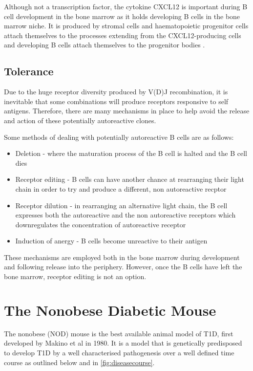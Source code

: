 Although not a transcription factor, the cytokine CXCL12 is important during B cell development in the bone marrow as it holds developing B cells in the bone marrow niche.
It is produced by stromal cells and haematopoietic progenitor cells attach themselves to the processes extending from the CXCL12-producing cells and developing B cells attach themselves to the progenitor bodies \citep{Tokoyoda2004}.

\subsection{Tolerance}

Due to the huge receptor diversity produced by V(D)J recombination, it is inevitable that some combinations will produce receptors responsive to self antigens.
Therefore, there are many mechanisms in place to help avoid the release and action of these potentially autoreactive clones.

Some methods of dealing with potentially autoreactive B cells are as follows:
\begin{itemize}
\item Deletion - where the maturation process of the B cell is halted and the B cell dies \citep{Cornall1995}
\item Receptor editing - B cells can have another chance at rearranging their light chain in order to try and produce a different, non autoreactive recptor \citep{Orduno2009, Gay1993}
\item Receptor dilution - in rearranging an alternative light chain, the B cell expresses both the autoreactive and the non autoreactive receptors which downregulates the concentration of autoreactive receptor \citep{Gay1993, Orduno2009}
\item Induction of anergy - B cells become unreactive to their antigen \citep{Orduno2009}
\end{itemize}

These mechanisms are employed both in the bone marrow during development and following release into the periphery.
However, once the B cells have left the bone marrow, receptor editing is not an option.



\section{The Nonobese Diabetic Mouse}

The nonobese (NOD) mouse is the best available animal model of T1D, first developed by Makino et al  in 1980.
It is a model that is genetically predisposed to develop T1D by a well characterised pathogenesis over a well defined time course as outlined below and in \cref{fig:diseasecourse}.

